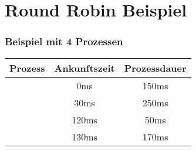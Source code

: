 \section{Round Robin Beispiel}

\begin{frame}
    \frametitle{Beispiel mit 4 Prozessen}


    \begin{table}[]
        \begin{adjustbox}{width=0.4\textwidth}
            \begin{tabular}{c|c|c}
                \textbf{Prozess} & \textbf{Ankunftszeit} & \textbf{Prozessdauer} \\
                \hline{}
                \PZero{}         & 0ms                   & 150ms                 \\
                \POne{}          & 30ms                  & 250ms                 \\
                \PTwo{}          & 120ms                 & 50ms                  \\
                \PThree{}        & 130ms                 & 170ms
            \end{tabular}
        \end{adjustbox}
    \end{table}


\end{frame}
